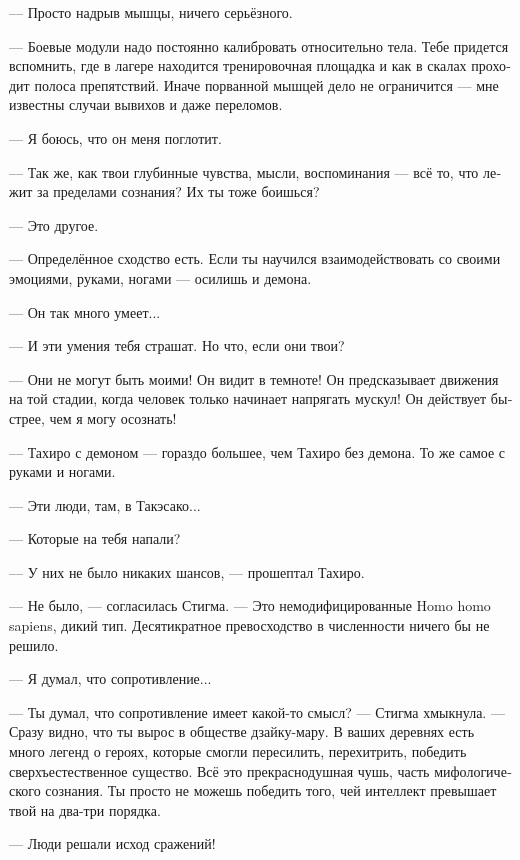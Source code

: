 \documentclass[a4paper,12pt,fleqn]{book}\usepackage{polyglossia}\setdefaultlanguage[babelshorthands=true]{russian}\setotherlanguage{english}\defaultfontfeatures{Ligatures=TeX,Mapping=tex-text}\usepackage{xcolor}\newcommand{\ml}[3]{#2}
\begin{document}
{--- Просто надрыв мышцы, ничего серьёзного.

--- Боевые модули надо постоянно калибровать относительно тела.
Тебе придется вспомнить, где в лагере находится тренировочная площадка и как в скалах проходит полоса препятствий.
Иначе порванной мышцей дело не ограничится --- мне известны случаи вывихов и даже переломов.

--- Я боюсь, что он меня поглотит.

--- Так же, как твои глубинные чувства, мысли, воспоминания --- всё то, что лежит за пределами сознания?
\ml{$0$}
{Их ты тоже боишься?}
{Are you afraid of 'em too?''}

--- Это другое.

--- Определённое сходство есть.
Если ты научился взаимодействовать со своими эмоциями, руками, ногами --- осилишь и демона.

--- Он так много умеет...

--- И эти умения тебя страшат.
Но что, если они твои?

--- Они не могут быть моими!
Он видит в темноте!
Он предсказывает движения на той стадии, когда человек только начинает напрягать мускул!
Он действует быстрее, чем я могу осознать!

--- Тахиро с демоном --- гораздо большее, чем Тахиро без демона.
То же самое с руками и ногами.

--- Эти люди, там, в Такэсако...

--- Которые на тебя напали?

--- У них не было никаких шансов, --- прошептал Тахиро.

--- Не было, --- согласилась Стигма.
--- Это немодифицированные Homo homo sapiens, дикий тип.
Десятикратное превосходство в численности ничего бы не решило.

--- Я думал, что сопротивление...

--- Ты думал, что сопротивление имеет какой-то смысл? --- Стигма хмыкнула.
--- Сразу видно, что ты вырос в обществе дзайку-мару.
В ваших деревнях есть много легенд о героях, которые смогли пересилить, перехитрить, победить сверхъестественное существо.
\ml{$0$}
{Всё это прекраснодушная чушь, часть мифологического сознания.}
{No more than a starry-eyed bullshit, a part of superstitious thinkin'.}
\ml{$0$}
{Ты просто не можешь победить того, чей интеллект превышает твой на два-три порядка.}
{You just can't defeat a person whose intelligence is two or three orders of magnitude higher than yours.''}

\ml{$0$}
{--- Люди решали исход сражений!}
{``Humans decide outcomes of battles!''}

}
\end{document}
